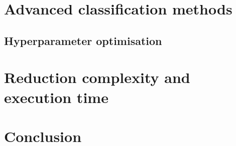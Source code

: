 \documentclass[conference,onecolumn]{IEEEtran}
\begin{document}
\section{Advanced classification methods}

    \subsection{Hyperparameter optimisation}

\section{Reduction complexity and execution time}
\section{Conclusion}













\newpage
\appendix
\end{document}
